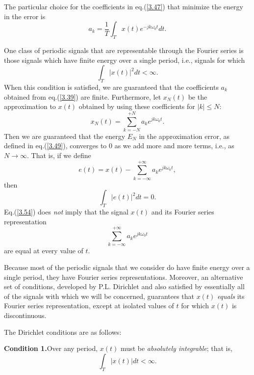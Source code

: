 \documentclass[a4paper,twoside]{book}
\begin{document}
The particular choice for the coefficients in eq.\;(\ref{3.47}) that minimize the energy in the error is
\begin{equation}
    a_k = \frac1T\int_Tx(t)e^{-jk\omega_0t} dt.
    \label{3.50}
\end{equation}

One class of periodic signals that are representable through the Fourier series is those signals which have finite energy over a single period, i.e., signals for which
\begin{equation}
    \int_T|x(t)|^2dt<\infty.
    \label{3.51}
\end{equation}
When this condition is satisfied, we are guaranteed that the coefficients $a_k$ obtained from eq.\;(\ref{3.39}) are finite. Furthermore, let $x_N(t)$ be the approximation to $x(t)$ obtained by using these coefficients for $|k|\le N$:
\begin{equation}
    x_N(t)=\sum_{k=-N}^{+N}a_ke^{jk\omega_0t}.
    \label{3.52}
\end{equation}
Then we are guaranteed that the energy $E_N$ in the approximation error, as defined in eq.\;(\ref{3.49}), converges to 0 as we add more and more terms, i.e., as $N\to\infty$. That is, if we define
\begin{equation}
    e(t) = x(t)-\sum_{k=-\infty}^{+\infty}a_ke^{jk\omega_0t},
    \label{3.53}
\end{equation}
then
\begin{equation}
    \int_T|e(t)|^2dt=0.
    \label{3.54}
\end{equation}
Eq.\;(\ref{3.54}) does \textit{not} imply that the signal $x(t)$ and its Fourier series representation
\begin{equation}
    \sum_{k=-\infty}^{+\infty}a_ke^{jk\omega_0t}
    \label{3.55}
\end{equation}
are equal at every value of $t$.

Because most of the periodic signals that we consider do have finite energy over a single period, they have Fourier series representations. Moreover, an alternative set of conditions, developed by P.L. Dirichlet and also satisfied by essentially all of the signals with which we will be concerned, guarantees that $x(t)$ \textit{equals} its Fourier series representation, except at isolated values of $t$ for which $x(t)$ is discontinuous.

The Dirichlet conditions are as follows:

\noindent\textbf{Condition 1.}\quad Over any period, $x(t)$ must be \textit{absolutely integrable}; that is,
\begin{equation}
    \int_T|x(t)|dt<\infty.
    \label{3.56}
\end{equation}
\end{document}
